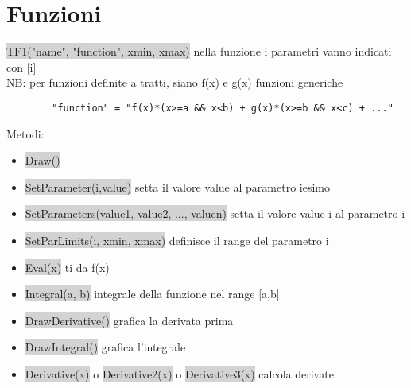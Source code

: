 \documentclass[a4paper]{article}
\begin{document}
\section{Funzioni}
    \colorbox{LightGray}{TF1("name", "function", xmin, xmax)} nella funzione i parametri vanno indicati con [i]\\
    NB: per funzioni definite a tratti, siano f(x) e g(x) funzioni generiche
    \begin{verbatim}
        "function" = "f(x)*(x>=a && x<b) + g(x)*(x>=b && x<c) + ..."
    \end{verbatim}
    Metodi:
    \begin{itemize}
        \item \colorbox{LightGray}{Draw()}
        \item \colorbox{LightGray}{SetParameter(i,value)} setta il valore value al parametro iesimo
        \item \colorbox{LightGray}{SetParameters(value1, value2, ..., valuen)} setta il valore value i al parametro i
        \item \colorbox{LightGray}{SetParLimits(i, xmin, xmax)} definisce il range del parametro i
        \item \colorbox{LightGray}{Eval(x)} ti da f(x)
        \item \colorbox{LightGray}{Integral(a, b)} integrale della funzione nel range [a,b]
        \item \colorbox{LightGray}{DrawDerivative()} grafica la derivata prima
        \item \colorbox{LightGray}{DrawIntegral()} grafica l’integrale
        \item \colorbox{LightGray}{Derivative(x)} o \colorbox{LightGray}{Derivative2(x)} o \colorbox{LightGray}{Derivative3(x)} calcola derivate
    \end{itemize}
\end{document}
